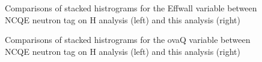 \begin{figure}[!htbp]
    \centering
    
    \caption{Comparisons of stacked histrograms for the Effwall variable between NCQE neutron tag on H analysis (left) and this analysis (right)} \label{fig:effwall_reduction} 
    
      \hfill 
     \par
    
        
\end{figure}

\begin{figure}[!htbp]
    \centering
    
    \caption{Comparisons of stacked histrograms for the ovaQ variable between NCQE neutron tag on H analysis (left) and this analysis (right)} \label{fig:ovaq_reduction} 
    
     \hfill 
     \par
    
        
\end{figure}

